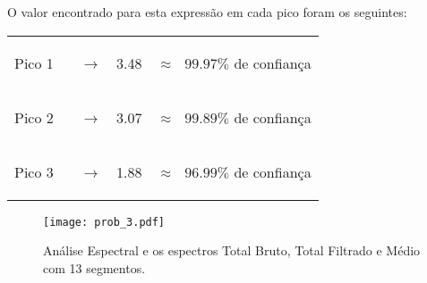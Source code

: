 \documentclass[12pt,portuguese,a4paper,pdftex]{article}
\renewcommand{\baselinestretch}{1.5}
\begin{document}
\vspace{.25cm}

O valor encontrado para esta expressão em cada pico foram os seguintes:

\begin{table}[ht]
\begin{center}
\vspace{.25cm}
\begin{tabular}{ccc}
\hline\hline
\begin{footnotesize} Pico 1 \ \ \  $\rightarrow$ \end{footnotesize} & \begin{footnotesize}3.48\end{footnotesize} & \begin{footnotesize} $\approx \ \ \  99.97\%$ de confiança \end{footnotesize}\\

\begin{footnotesize} Pico 2 \ \ \ $\rightarrow$ \end{footnotesize} & \begin{footnotesize}3.07\end{footnotesize} & \begin{footnotesize} $\approx \ \ \ 99.89\%$ de confiança \end{footnotesize}\\

\begin{footnotesize} Pico 3 \ \ \ $\rightarrow$ \end{footnotesize} & \begin{footnotesize}1.88\end{footnotesize} & \begin{footnotesize} $\approx \ \ \ 96.99\%$ de confiança \end{footnotesize}\\
\hline\hline
\end{tabular}
\end{center}
\end{table}




\vspace{0.5cm}

\begin{figure}[ht]
\begin{center}
\texttt{[image: prob\_3.pdf]}
\end{center}
\vspace{-0.5cm}
\renewcommand{\baselinestretch}{.5}
\caption{\label{fig:prob_3} \small{Análise Espectral e os espectros Total Bruto, Total Filtrado e Médio com 13 segmentos.}}
\end{figure}
\end{document}
